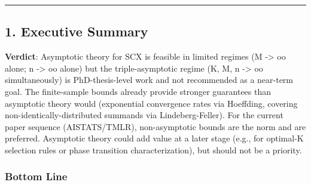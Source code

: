 \documentclass[
  12pt,
]{article}
\begin{document}
\begin{center}\rule{0.5\linewidth}{0.5pt}\end{center}

\subsection{1. Executive Summary}\label{executive-summary}

\textbf{Verdict}: Asymptotic theory for SCX is feasible in limited
regimes (M -\textgreater{} oo alone; n -\textgreater{} oo alone) but the
triple-asymptotic regime (K, M, n -\textgreater{} oo simultaneously) is
PhD-thesis-level work and not recommended as a near-term goal. The
finite-sample bounds already provide stronger guarantees than asymptotic
theory would (exponential convergence rates via Hoeffding, covering
non-identically-distributed summands via Lindeberg-Feller). For the
current paper sequence (AISTATS/TMLR), non-asymptotic bounds are the
norm and are preferred. Asymptotic theory could add value at a later
stage (e.g., for optimal-K selection rules or phase transition
characterization), but should not be a priority.

\subsubsection{Bottom Line}\label{bottom-line}
\end{document}

